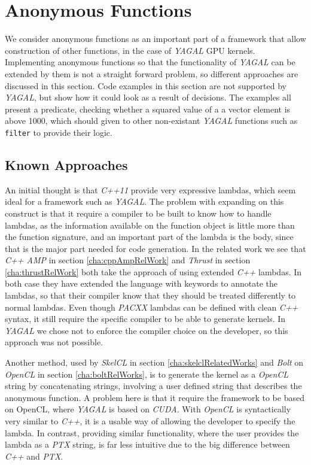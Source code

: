 \section{Anonymous Functions}
We consider anonymous functions as an important part of a framework that allow construction of other functions, in the case of \textit{YAGAL} GPU kernels. Implementing anonymous functions so that the functionality of \textit{YAGAL} can be extended by them is not a straight forward problem, so different approaches are discussed in this section. Code examples in this section are not supported by \textit{YAGAL}, but show how it could look as a result of decisions. The examples all present a predicate, checking whether a squared value of a a vector element is above 1000, which should given to other non-existant \textit{YAGAL} functions such as \texttt{filter} to provide their logic.

\subsection{Known Approaches}
An initial thought is that \textit{C++11} provide very expressive lambdas, which seem ideal for a framework such as \textit{YAGAL}. The problem with expanding on this construct is that it require a compiler to be built to know how to handle lambdas, as the information available on the function object is little more than the function signature\cite{cppLambdaRef}, and an important part of the lambda is the body, since that is the major part needed for code generation. In the related work we see that \textit{C++ AMP} in section \ref{cha:cppAmpRelWork} and \textit{Thrust} in section \ref{cha:thrustRelWork} both take the approach of using extended \textit{C++} lambdas. In both case they have extended the language with keywords to annotate the lambdas, so that their compiler know that they should be treated differently to normal lambdas. Even though \textit{PACXX} lambdas can be defined with clean \textit{C++} syntax, it still require the specific compiler to be able to generate kernels. In \textit{YAGAL} we chose not to enforce the compiler choice on the developer, so this approach was not possible.

Another method, used by \textit{SkelCL} in section \ref{cha:skelclRelatedWorks} and \textit{Bolt} on \textit{OpenCL} in section \ref{cha:boltRelWorks}, is to generate the kernel as a \textit{OpenCL} string by concatenating strings, involving a user defined string that describes the anonymous function. A problem here is that it require the framework to be based on OpenCL, where \textit{YAGAL} is based on \textit{CUDA}. With \textit{OpenCL} is syntactically very similar to \textit{C++}, it is a usable way of allowing the developer to specify the lambda. In contrast, providing similar functionality, where the user provides the lambda as a \textit{PTX} string, is far less intuitive due to the big difference between \textit{C++} and \textit{PTX}.

